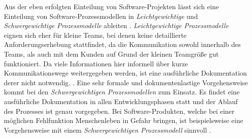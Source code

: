 Aus der eben erfolgten Einteilung von Software-Projekten lässt sich eine Einteilung von Software-Prozessmodellen in \textit{Leichtgewichtige} und \textit{Schwergewichtige Prozessmodelle} ableiten \cite{Hanser2010}. \newline
\textit{Leichtgewichtige Prozessmodelle} eignen sich eher für kleine Teams, bei denen keine detaillierte Anforderungserhebung stattfindet, da die Kommunikation sowohl innerhalb des Teams, als auch mit dem Kunden auf Grund der kleinen Teamgröße gut funktioniert. Da viele Informationen hier informell über kurze Kommunikationswege weitergegeben werden, ist eine ausführliche Dokumentation derer nicht notwendig. \cite{Hanser2010}. \newline
Eine sehr formale und dokumentenlastige Vorgehensweise kommt bei den \textit{Schwergewichtigen Prozessmodellen} zum Einsatz. Es findet eine ausführliche Dokumentation in allen Entwicklungsphasen statt und der Ablauf des Prozesses ist genau vorgegeben. Bei Software-Produkten, welche bei einer möglichen Fehlfunktion Menschenleben in Gefahr bringen, ist beispielsweise eine Vorgehensweise mit einem \textit{Schwergewichtigen Prozessmodell} sinnvoll \cite{Hanser2010}. \newline














